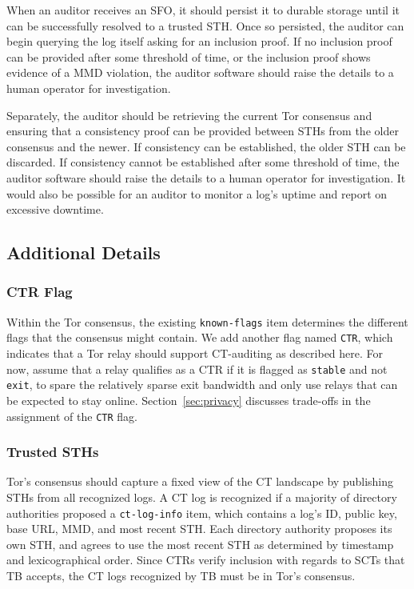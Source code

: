 When an auditor receives an SFO, it should persist it to durable storage until
it can be successfully resolved to a trusted STH\@. Once so persisted, the
auditor can begin querying the log itself asking for an inclusion proof. If no
inclusion proof can be provided after some threshold of time, or the inclusion
proof shows evidence of a MMD violation, the auditor software should raise the
details to a human operator for investigation.

Separately, the auditor should be retrieving the current Tor consensus and
ensuring that a consistency proof can be provided between STHs from the older
consensus and the newer. If consistency can be established, the older STH can be
discarded. If consistency cannot be established after some threshold of time,
the auditor software should raise the details to a human operator for
investigation. It would also be possible for an auditor to monitor a log's
uptime and report on excessive downtime.

\subsection{Additional Details} \label{sec:base:consensus}

\subsubsection{CTR Flag} \label{sec:base:consensus:ctr-flag} Within the Tor
consensus, the existing \texttt{known-flags} item determines the different flags
that the consensus might contain.  We add another flag named \texttt{CTR}, which
indicates that a Tor relay should support CT-auditing as described here. For
now, assume that a relay qualifies as a CTR if it is flagged as \texttt{stable}
and not \texttt{exit}, to spare the relatively sparse exit bandwidth and only
use relays that can be expected to stay online. Section~\ref{sec:privacy}
discusses trade-offs in the assignment of the \texttt{CTR} flag.

\subsubsection{Trusted STHs}
Tor's consensus should capture a fixed view of the CT landscape by publishing
STHs from all recognized logs.  A CT log is recognized if a majority of
directory authorities proposed a \texttt{ct-log-info} item, which contains a
log's ID, public key, base URL, MMD, and most recent STH\@.  Each directory
authority proposes its own STH, and agrees to use the most recent STH as
determined by timestamp and lexicographical order.  Since CTRs verify inclusion
with regards to SCTs that TB accepts, the CT logs recognized by TB must be in
Tor's consensus.

